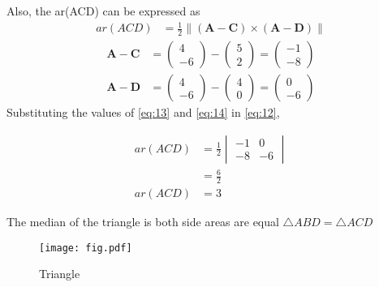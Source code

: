 \documentclass[12pt]{article}
\newcommand{\mydet}[1]{\ensuremath{\begin{vmatrix}#1\end{vmatrix}}}
\providecommand{\brak}[1]{\ensuremath{\left(#1\right)}}
\newcommand{\myvec}[1]{\ensuremath{\begin{pmatrix}#1\end{pmatrix}}}
\providecommand{\norm}[1]{\left\lVert#1\right\rVert}
\let\vec\mathbf
\begin{document}
		Also, the ar(ACD) can be expressed as
  \begin{align}
  ar(ACD)&=\frac{1}{2} \norm{\brak{\vec{A}-\vec{C}}  \times 
   \brak{\vec{A}- \vec{D}}} \label{eq:12}
\end{align}
\begin{align}
	\vec{A}- \vec{C} &= \myvec{4\\ -6}-\myvec{5\\ 2}=\myvec{-1\\ -8}\label{eq:13} \\
	  \vec{A}- \vec{D} &= \myvec{4\\ -6}-\myvec{4\\ 0}=\myvec{0\\ -6}\label{eq:14} 
  \end{align}
		Substituting the values of \eqref{eq:13} and \eqref{eq:14} in \eqref{eq:12},

		\begin{align}
	ar(ACD)&=\frac{1}{2}\mydet{-1 & 0\\-8 & -6}\\ 
	       &=\frac{6}{2}\\
	ar(ACD)&= 3
\end{align}
		
The median of the triangle is  both side areas are equal $\triangle ABD=\triangle ACD$
\begin{figure}[h!]
\centering
\texttt{[image: fig.pdf]}
\caption{Triangle}
\label{fig-}
\end{figure} 
\end{document}
